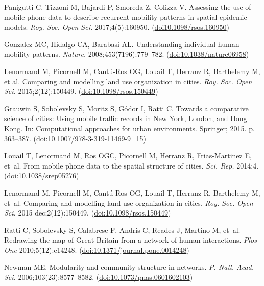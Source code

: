 \documentclass[%
preprint,
 amsmath,amssymb,
pra,
]{revtex4-1}
\begin{document}
\begin{thebibliography}{10}
Panigutti C, Tizzoni M, Bajardi P, Smoreda Z, Colizza V. Assessing the use of mobile phone data to describe recurrent mobility patterns in spatial epidemic models. \emph{Roy. Soc. Open Sci.} 2017;4(5):160950. (\href{https://dx.doi.org/10.1098/rsos.160950}{doi10.1098/rsos.160950})

Gonzalez MC, Hidalgo CA, Barabasi AL. Understanding individual human mobility patterns.
\emph{Nature.} 2008;453(7196):779--782. (\href{https://dx.doi.org/doi:10.1038/nature06958}{doi:10.1038/nature06958})

Lenormand M, Picornell M, Cant{\'u}-Ros OG, Louail T, Herranz R, Barthelemy M,
  et al. Comparing and modelling land use organization in cities. \emph{Roy. Soc. Open Sci.} 2015;2(12):150449. (\href{https://dx.doi.org/10.1098/rsos.150449}{doi:10.1098/rsos.150449})

Grauwin S, Sobolevsky S, Moritz S, G{\'o}dor I, Ratti C. Towards a comparative science of cities: Using mobile traffic records in New York, London, and Hong Kong. In: Computational approaches for urban environments. Springer; 2015. p. 363--387. (\href{https://dx.doi.org/10.1007/978-3-319-11469-9\_15}{doi:10.1007/978-3-319-11469-9\_15})

Louail T, Lenormand M, Ros OGC, Picornell M, Herranz R, Frias-Martinez E, et~al. From mobile phone data to the spatial structure of cities. \emph{Sci. Rep.} 2014;4. (\href{https://dx.doi.org/10.1038/srep05276}{doi:10.1038/srep05276})

Lenormand M, Picornell M, Cant{\'{u}}-Ros OG, Louail T, Herranz R, Barthelemy M, et~al. {Comparing and modelling land use organization in cities}. \emph{Roy. Soc. Open Sci.} 2015 dec;2(12):150449. (\href{https://dx.doi.org/10.1098/rsos.150449}{doi:10.1098/rsos.150449})

Ratti C, Sobolevsky S, Calabrese F, Andris C, Reades J, Martino M, et~al. Redrawing the map of Great Britain from a network of human interactions. \emph{Plos One} 2010;5(12):e14248. (\href{https://dx.doi.org/    10.1371/journal.pone.0014248}{doi:10.1371/journal.pone.0014248})

Newman ME. Modularity and community structure in networks. \emph{P. Natl. Acad. Sci.}
  2006;103(23):8577--8582.
(\href{https://dx.doi.org/10.1073/pnas.0601602103}{doi:10.1073/pnas.0601602103})


\end{thebibliography}
\end{document}

